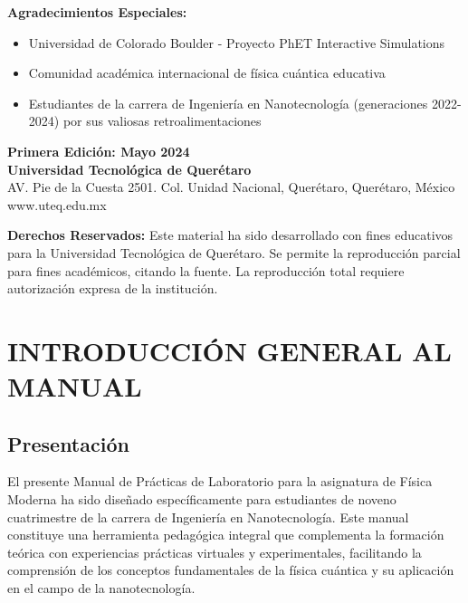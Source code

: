 \documentclass[12pt,a4paper]{book}
\begin{document}
	\vspace{1cm}
	
	\textbf{Agradecimientos Especiales:}
	\begin{itemize}[leftmargin=2cm]
		\item Universidad de Colorado Boulder - Proyecto PhET Interactive Simulations
		\item Comunidad académica internacional de física cuántica educativa
		\item Estudiantes de la carrera de Ingeniería en Nanotecnología (generaciones 2022-2024) por sus valiosas retroalimentaciones
	\end{itemize}
	
	\vspace{1cm}
	
	\begin{center}
		\textbf{Primera Edición: Mayo 2024}\\
		\textbf{Universidad Tecnológica de Querétaro}\\
	AV. Pie de la Cuesta 2501. Col. Unidad Nacional, Querétaro, Querétaro, México  \\
		www.uteq.edu.mx
	\end{center}
	
	\vspace{1cm}
	
	\begin{tcolorbox}[colback=gray!10!white,colframe=gray]
		\textbf{Derechos Reservados:} Este material ha sido desarrollado con fines educativos para la Universidad Tecnológica de Querétaro. Se permite la reproducción parcial para fines académicos, citando la fuente. La reproducción total requiere autorización expresa de la institución.
	\end{tcolorbox}
	
	\newpage
	
	\tableofcontents
	
	\chapter{INTRODUCCIÓN GENERAL AL MANUAL}
	
	\section{Presentación}
	
	El presente Manual de Prácticas de Laboratorio para la asignatura de Física Moderna ha sido diseñado específicamente para estudiantes de noveno cuatrimestre de la carrera de Ingeniería en Nanotecnología. Este manual constituye una herramienta pedagógica integral que complementa la formación teórica con experiencias prácticas virtuales y experimentales, facilitando la comprensión de los conceptos fundamentales de la física cuántica y su aplicación en el campo de la nanotecnología.
	
\end{document}
